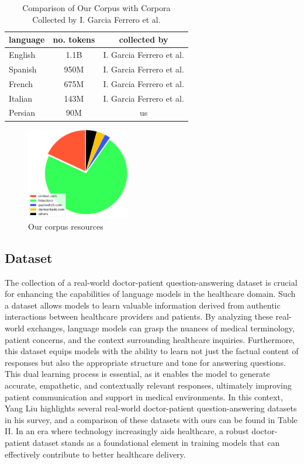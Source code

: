 \documentclass[conference]{IEEEtran}
\begin{document}
	\begin{table}[ht]
		\centering
		\caption{Comparison of Our Corpus with Corpora Collected by I. Garcia Ferrero et al.}
		\begin{tabular}{|l|c|c|}  %
			\hline
			language& no. tokens & collected by \\ \hline
			English & 1.1B & I. Garcia Ferrero et al. \\ \hline
			Spanish & 950M & I. Garcia Ferrero et al.  \\ \hline
			French & 675M & I. Garcia Ferrero et al.  \\ \hline
			Italian& 143M &  I. Garcia Ferrero et al.  \\ \hline
			Persian& 90M & us	\\ \hline
		\end{tabular}
		\label{tab:model_results_on_mcqa}
	\end{table}
	
	\begin{figure}[htbp]
		\centerline{\includegraphics[width=0.4\textwidth]{fig1.png}}
		\caption{Our corpus resources}
		\label{fig1}
	\end{figure}
	
	\subsection{Dataset}
	The collection of a real-world doctor-patient question-answering dataset is crucial for enhancing the capabilities of language models in the healthcare domain. Such a dataset allows models to learn valuable information derived from authentic interactions between healthcare providers and patients. By analyzing these real-world exchanges, language models can grasp the nuances of medical terminology, patient concerns, and the context surrounding healthcare inquiries. Furthermore, this dataset equips models with the ability to learn not just the factual content of responses but also the appropriate structure and tone for answering questions. This dual learning process is essential, as it enables the model to generate accurate, empathetic, and contextually relevant responses, ultimately improving patient communication and support in medical environments. In this context, Yang Liu 
	\cite{b19}
	highlights several real-world doctor-patient question-answering datasets in his survey, and a comparison of these datasets with ours can be found in Table II. In an era where technology increasingly aids healthcare, a robust doctor-patient dataset stands as a foundational element in training models that can effectively contribute to better healthcare delivery.
	
\end{document}
